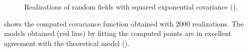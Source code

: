 \begin{figure}[H]
 \caption{Realizations of random fields with squared exponential covariance ().}
 \label{fig-uncondFields}
\end{figure}


 shows the computed covariance function obtained with 2000 realizations. 
The models obtained (red line) by fitting the computed points are in excellent agreement with the theoretical model ().

